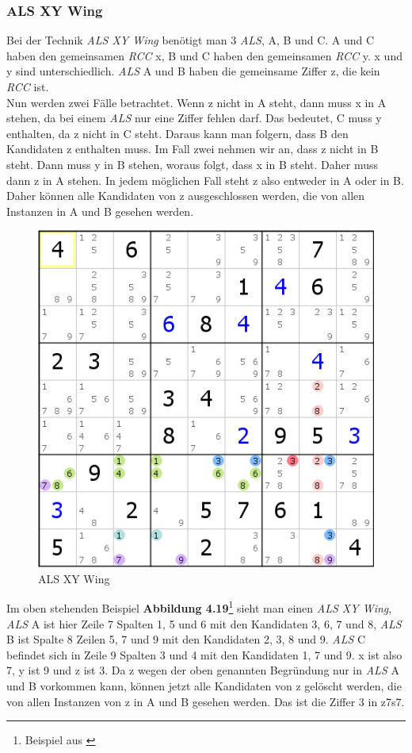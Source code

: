 \newpage
\subsubsection{ALS XY Wing}
Bei der Technik \textit{ALS XY Wing} benötigt man 3 \textit{ALS}, A, B und C. A und C haben den gemeinsamen \textit{RCC} x, B und C haben den gemeinsamen \textit{RCC} y. x und y sind unterschiedlich. \textit{ALS} A und B haben die gemeinsame Ziffer z, die kein \textit{RCC} ist.\\
Nun werden zwei Fälle betrachtet. Wenn z nicht in A steht, dann muss x in A stehen, da bei einem \textit{ALS} nur eine Ziffer fehlen darf. Das bedeutet, C muss y enthalten, da z nicht in C steht. Daraus kann man folgern, dass B den Kandidaten z enthalten muss. Im Fall zwei nehmen wir an, dass z nicht in B steht. Dann muss y in B stehen, woraus folgt, dass x in B steht. Daher muss dann z in A stehen. In jedem möglichen Fall steht z also entweder in A oder in B. Daher können alle Kandidaten von z ausgeschlossen werden, die von allen Instanzen in A und B gesehen werden.

\begin{figure}[h]
\begin{center}
\includegraphics{./img/ALS_XY_Wing.png}
\caption{ALS XY Wing}
\end{center}
\end{figure}

\noindent Im oben stehenden Beispiel \textbf{Abbildung 4.19}\footnote{Beispiel aus \cite{HDKALSXYWing}} sieht man einen \textit{ALS XY Wing}, \textit{ALS} A ist hier Zeile 7 Spalten 1, 5 und 6 mit den Kandidaten 3, 6, 7 und 8, \textit{ALS} B ist Spalte 8 Zeilen 5, 7 und 9 mit den Kandidaten 2, 3, 8 und 9. \textit{ALS} C befindet sich in Zeile 9 Spalten 3 und 4 mit den Kandidaten 1, 7 und 9. x ist also 7, y ist 9 und z ist 3. Da z wegen der oben genannten Begründung nur in \textit{ALS} A und B vorkommen kann, können jetzt alle Kandidaten von z gelöscht werden, die von allen Instanzen von z in A und B gesehen werden. Das ist die Ziffer 3 in z7s7.